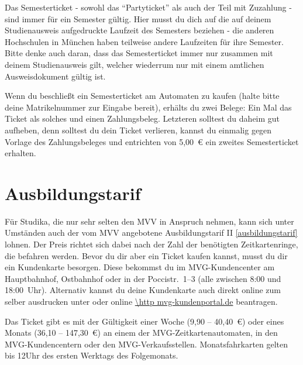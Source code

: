 Das Semesterticket - sowohl das "`Partyticket"' als auch der Teil mit Zuzahlung - sind immer für ein Semester gültig. Hier musst du dich auf die auf deinem Studienausweis aufgedruckte Laufzeit des Semesters beziehen - die anderen Hochschulen in München haben teilweise andere Laufzeiten für ihre Semester. Bitte denke auch daran, dass das Semesterticket immer nur zusammen mit deinem Studienausweis gilt, welcher wiederrum nur mit einem amtlichen Ausweisdokument gültig ist.

Wenn du beschließt ein Semesterticket am Automaten zu kaufen (halte bitte deine Matrikelnummer zur Eingabe bereit), erhälts du zwei Belege: Ein Mal das Ticket als solches und einen Zahlungsbeleg. Letzteren solltest du daheim gut aufheben, denn solltest du dein Ticket verlieren, kannst du einmalig gegen Vorlage des Zahlungsbeleges und entrichten von 5,00~€ ein zweites Semesterticket erhalten.

\begin{urlList}
\end{urlList}

\section{Ausbildungstarif}
Für Studika, die nur sehr selten den MVV in Anspruch nehmen, kann sich unter Umständen auch der vom MVV angebotene Ausbildungstarif II \ref{ausbildungstarif} lohnen. Der Preis richtet sich dabei nach der Zahl der benötigten Zeitkartenringe, die befahren werden. Bevor du dir aber ein Ticket kaufen kannst, musst du dir ein Kundenkarte besorgen. Diese bekommst du im MVG-Kundencenter am Hauptbahnhof, Ostbahnhof oder in der Poccistr.~1--3 (alle zwischen 8:00 und 18:00~Uhr). Alternativ kannst du deine Kundenkarte auch direkt online zum selber ausdrucken unter oder online \url{\http mvg-kundenportal.de} beantragen.

Das Ticket gibt es mit der Gültigkeit einer Woche (9,90 -- 40,40~€) oder eines Monats (36,10 -- 147,30~€) an einem der MVG-Zeitkartenautomaten, in den MVG-Kundencentern oder den MVG-Verkaufsstellen. Monatsfahrkarten gelten bis 12Uhr des ersten Werktags des Folgemonats.

\begin{urlList}
\end{urlList}